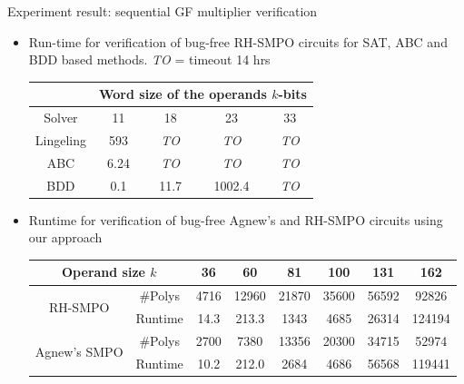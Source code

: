\documentclass[xcolor=dvipsnames]{beamer}
\newcommand{\bi}{\begin{itemize}}
\newcommand{\ei}{\end{itemize}}
\begin{document}
\begin{frame}[label = expSMPO]{\large{Experiment result: sequential GF multiplier verification}}
\bi
\item Run-time for verification of bug-free RH-SMPO circuits
  for SAT, ABC and BDD based methods. \emph{TO} = timeout 14 hrs
\begin{table}[H]
\centering
\label{tbl:equiv}
\begin{tabular}{|c||c|c|c|c|} 
\hline
& \multicolumn{4}{|c|}{Word size of the operands $k$-bits}  \\
\hline
Solver & 11 & 18 & 23 & 33 \\
\hline
\hline
Lingeling & 593  & \emph{TO}  & \emph{TO}  & \emph{TO}\\
\hline
\hline
ABC & 6.24 & \emph{TO} & \emph{TO} & \emph{TO}\\
\hline
\hline
BDD & 0.1 & 11.7 & 1002.4 & \emph{TO}  \\
\hline
\end{tabular}
\label{table:satbdd}  
\end{table} 
\item Runtime for verification of bug-free Agnew's and RH-SMPO circuits using our approach
\hspace{-0.3in}\begin{table}[H]
\centering
\label{tab:Cpp}
{\small 
\begin{tabular}{|c|c||c|c|c|c|c|c|}
\hline
\multicolumn{2}{|c||}{\centering Operand size $k$} & 36 & 60 & 81 & 100 & 131 & 162 \\
\hline
\multirow{2}{1cm}{\centering RH-SMPO} & \#Polys & 4716 & 12960 & 21870 & 35600 & 56592 & 92826 \\
\cline{2-8}
 & Runtime & 14.3 & 213.3 & 1343 & 4685 & 26314 & 124194 \\
\hline
\multirow{2}{1cm}{\centering Agnew's SMPO} & \#Polys & 2700 & 7380 & 13356 & 20300 & 34715 & 52974 \\
\cline{2-8}
 & Runtime & 10.2 & 212.0 & 2684 & 4686 & 56568 & 119441 \\
 
 \hline

\end{tabular}
}
\end{table}
\ei
\hyperlink{motiv2}{}
\end{frame}
\end{document}
